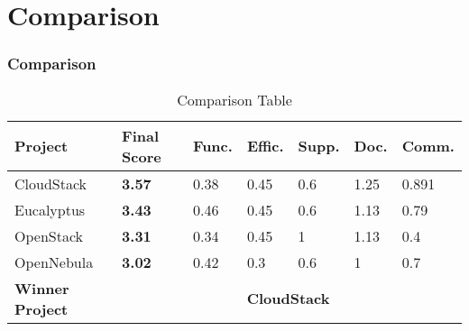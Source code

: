 \section{Comparison}

\begin{frame}[allowframebreaks]
\frametitle{Comparison}

\begin{table}[H]
  \begin{center}
    \begin{tabular}{ | p{2cm} | p{1cm} | p{1cm} | p{1cm} | p{1cm} | p{1cm} | p{1cm} | }
    \toprule
    Project & \textbf{Final Score} & Func. & Effic. & Supp. & Doc. & Comm.\\
    \hline
    CloudStack & \textbf{3.57} & 0.38 & 0.45 & 0.6 & 1.25 & 0.891\\
    \hline
    Eucalyptus & \textbf{3.43} & 0.46 & 0.45 & 0.6 & 1.13 & 0.79\\
    \hline
    OpenStack & \textbf{3.31} & 0.34 & 0.45 & 1 & 1.13 & 0.4\\
    \hline
    OpenNebula & \textbf{3.02} & 0.42 & 0.3 & 0.6 & 1 & 0.7\\
    \midrule
    \textbf{Winner Project} & \multicolumn {6}{c|}{\textbf{CloudStack}}\\
    \bottomrule
    \end{tabular}
    \caption{Comparison Table}
    \label{tab:comparison_table}
  \end{center}
\end{table}

\end{frame}

